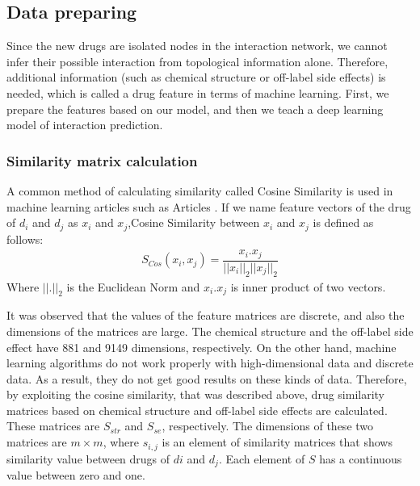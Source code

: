 \documentclass{bmcart}
\begin{document}
\subsection*{Data preparing}
Since the new drugs are isolated nodes in the interaction network, we cannot infer their possible interaction from topological information alone. Therefore, additional information (such as chemical structure or off-label side effects) is needed, which is called a drug feature in terms of machine learning. First, we prepare the features based on our model, and then we teach a deep learning model of interaction prediction.

\subsubsection*{Similarity matrix calculation}

A common method of calculating similarity called Cosine Similarity is used in machine learning articles such as Articles \cite{zhang2016drug, zhang2018manifold}. If we name feature vectors of the drug of $d_i$ and $d_j$
as $x_i$ and $x_j$,Cosine Similarity between $x_i$ and $x_j$ is defined as follows:
\begin{equation}
	\begin{aligned}
		S_{Cos}(x_i,x_j) =\dfrac{x_i . x_j}{||x_i||_2 ||x_j||_2}
	\end{aligned}
\end{equation}
Where $||.||_2$ is the Euclidean Norm and ${x_i . x_j}$ is inner product of two vectors.

It was observed that the values of the feature matrices are discrete, and also the dimensions of the matrices are large. The chemical structure and the off-label side effect have 881 and 9149 dimensions, respectively. On the other hand, machine learning algorithms do not work properly with high-dimensional data and discrete data. As a result, they do not get good results on these kinds of data. Therefore, by exploiting the cosine similarity, that was described above, drug similarity matrices based on chemical structure and off-label side effects are calculated. These matrices are $S_{str}$ and $S_{se}$, respectively. The dimensions of these two matrices are $m \times m$, where $s_{i,j}$ is an element of similarity matrices that shows similarity value between drugs of $di$ and $d_j$. Each element of $S$ has a continuous value between zero and one.
\end{document}
